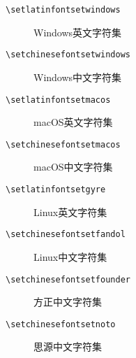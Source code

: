 \begin{description}
    \item[\texttt{\textbackslash set\textunderscore latin\textunderscore fontset\textunderscore windows}] Windows英文字符集
    \item[\texttt{\textbackslash set\textunderscore chinese\textunderscore fontset\textunderscore windows}] Windows中文字符集
    \item[\texttt{\textbackslash set\textunderscore latin\textunderscore fontset\textunderscore macos}] macOS英文字符集
    \item[\texttt{\textbackslash set\textunderscore chinese\textunderscore fontset\textunderscore macos}] macOS中文字符集
    \item[\texttt{\textbackslash set\textunderscore latin\textunderscore fontset\textunderscore gyre}] Linux英文字符集
    \item[\texttt{\textbackslash set\textunderscore chinese\textunderscore fontset\textunderscore fandol}] Linux中文字符集
    \item[\texttt{\textbackslash set\textunderscore chinese\textunderscore fontset\textunderscore founder}] 方正中文字符集
    \item[\texttt{\textbackslash set\textunderscore chinese\textunderscore fontset\textunderscore noto}] 思源中文字符集
\end{description}
